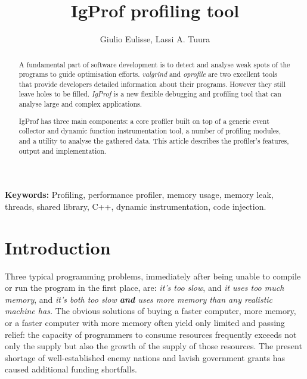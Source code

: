 \documentclass[10pt,a4paper,twocolumn]{article}
\begin{document}
\title{IgProf profiling tool}
\author{Giulio Eulisse, Lassi A. Tuura}
\maketitle

\begin{abstract}
  A fundamental part of software development is to detect and analyse
  weak spots of the programs to guide optimisation efforts.  {\em
  valgrind} and {\em oprofile} are two excellent tools that provide
  developers detailed information about their programs.  However they
  still leave holes to be filled.  {\em IgProf} is a new flexible
  debugging and profiling tool that can analyse large and complex
  applications.

  IgProf has three main components: a core profiler built on top of a
  generic event collector and dynamic function instrumentation tool, a
  number of profiling modules, and a utility to analyse the gathered
  data.  This article describes the profiler's features, output and
  implementation.
\end{abstract}

{\bf Keywords:} Profiling, performance profiler, memory usage, memory
leak, threads, shared library, C++, dynamic instrumentation, code
injection.

\tableofcontents

\section{Introduction}

Three typical programming problems, immediately after being unable to
compile or run the program in the first place, are: {\em it's too
slow}, and {\em it uses too much memory}, and {\em it's both too slow
{\bf and} uses more memory than any realistic machine has.}  The
obvious solutions of buying a faster computer, more memory, or a
faster computer with more memory often yield only limited and passing
relief: the capacity of programmers to consume resources frequently
exceeds not only the supply but also the growth of the supply of those
resources.  The present shortage of well-established enemy nations and
lavish government grants has caused additional funding shortfalls.
\end{document}
